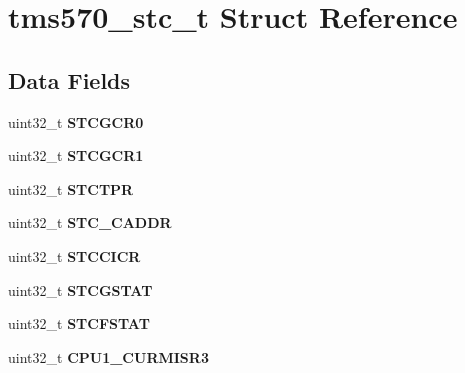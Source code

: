 \hypertarget{structtms570__stc__t}{}\section{tms570\+\_\+stc\+\_\+t Struct Reference}
\label{structtms570__stc__t}
\subsection*{Data Fields}
\begin{DoxyCompactItemize}
\item 
\mbox{\label{structtms570__stc__t_acd399761e8aaf53b452ee667a619add3}} 
uint32\+\_\+t {\bfseries S\+T\+C\+G\+C\+R0}
\item 
\mbox{\label{structtms570__stc__t_a002cc4d4ffaac4f5ed7d2f9f688e752e}} 
uint32\+\_\+t {\bfseries S\+T\+C\+G\+C\+R1}
\item 
\mbox{\label{structtms570__stc__t_af3839c6e8da0e70959c319cf3ddc0a7f}} 
uint32\+\_\+t {\bfseries S\+T\+C\+T\+PR}
\item 
\mbox{\label{structtms570__stc__t_aadd72f62e741bcd39f423965ebe65729}} 
uint32\+\_\+t {\bfseries S\+T\+C\+\_\+\+C\+A\+D\+DR}
\item 
\mbox{\label{structtms570__stc__t_ae53fa22022c7bedde093879b2be6b290}} 
uint32\+\_\+t {\bfseries S\+T\+C\+C\+I\+CR}
\item 
\mbox{\label{structtms570__stc__t_a55a01614e1977863792a6ba584f0d5f3}} 
uint32\+\_\+t {\bfseries S\+T\+C\+G\+S\+T\+AT}
\item 
\mbox{\label{structtms570__stc__t_a4667da8a783824c32836bfc2d1d58923}} 
uint32\+\_\+t {\bfseries S\+T\+C\+F\+S\+T\+AT}
\item 
\mbox{\label{structtms570__stc__t_a08cab8da855865f2272d9a3a7f8d00a4}} 
uint32\+\_\+t {\bfseries C\+P\+U1\+\_\+\+C\+U\+R\+M\+I\+S\+R3}
\item 
\mbox{\label{structtms570__stc__t_ab9c502d7636a26fedee0847bcf1cb56a}} 

\end{DoxyCompactItemize}
